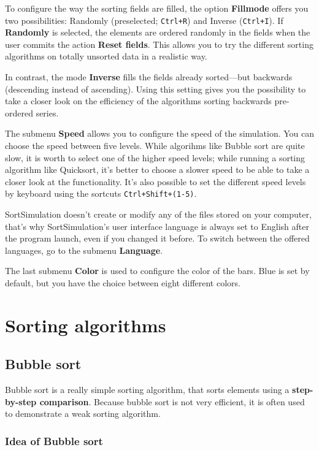 \documentclass[11pt, a4paper, titlepage, twoside]{article}
\renewcommand{\emph}{\textbf}
\begin{document}
	To configure the way the sorting fields are filled, the option \emph{Fillmode} offers you two possibilities: Randomly (preselected; \texttt{Ctrl+R}) and Inverse (\texttt{Ctrl+I}). If \emph{Randomly} is selected, the elements are ordered randomly in the fields when the user commits the action \emph{Reset fields}. This allows you to try the different sorting algorithms on totally unsorted data in a realistic way.
	
	In contrast, the mode \emph{Inverse} fills the fields already sorted---but backwards (descending instead of ascending). Using this setting gives you the possibility to take a closer look on the efficiency of the algorithms sorting backwards pre-ordered series.
	
	The submenu \emph{Speed} allows you to configure the speed of the simulation. You can choose the speed between five levels. While algorihms like Bubble sort are quite slow, it is worth to select one of the higher speed levels; while running a sorting algorithm like Quicksort, it's better to choose a slower speed to be able to take a closer look at the functionality. It's also possible to set the different speed levels by keyboard using the sortcuts \texttt{Ctrl+Shift+(1-5)}.
	
	SortSimulation doesn't create or modify any of the files stored on your computer, that's why SortSimulation's user interface language is always set to English after the program launch, even if you changed it before. To switch between the offered languages, go to the submenu \emph{Language}.
	
	The last submenu \emph{Color} is used to configure the color of the bars. Blue is set by default, but you have the choice between eight different colors.
	
	\section{Sorting algorithms}
	
	\subsection{Bubble sort}
	
	Bubble sort is a really simple sorting algorithm, that sorts elements using a \emph{step-by-step comparison}. Because bubble sort is not very efficient, it is often used to demonstrate a weak sorting algorithm.
	
	\subsubsection{Idea of Bubble sort}
	
\end{document}
